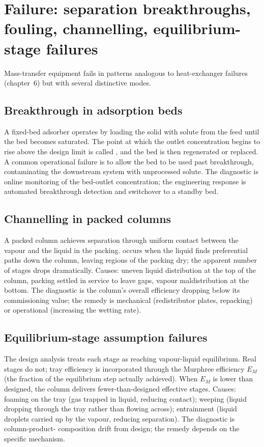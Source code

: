 \section{Failure: separation breakthroughs, fouling, channelling, equilibrium-stage failures}

Mass-transfer equipment fails in patterns analogous to heat-exchanger
failures (chapter~6) but with several distinctive modes.

\subsection{Breakthrough in adsorption beds}

A fixed-bed adsorber operates by loading the solid with solute from
the feed until the bed becomes saturated. The point at which the
outlet concentration begins to rise above the design limit is called
, and the bed is then regenerated or replaced.
A common operational failure is to allow the bed to be used past
breakthrough, contaminating the downstream system with unprocessed
solute. The diagnostic is online monitoring of the bed-outlet
concentration; the engineering response is automated breakthrough
detection and switchover to a standby bed.

\subsection{Channelling in packed columns}

A packed column achieves separation through uniform contact between
the vapour and the liquid in the packing. 
occurs when the liquid finds preferential paths down the column,
leaving regions of the packing dry; the apparent number of stages
drops dramatically. Causes: uneven liquid distribution at the top of
the column, packing settled in service to leave gaps, vapour
maldistribution at the bottom. The diagnostic is the column's
overall efficiency dropping below its commissioning value; the
remedy is mechanical (redistributor plates, repacking) or
operational (increasing the wetting rate).

\subsection{Equilibrium-stage assumption failures}

The design analysis treats each stage as reaching vapour-liquid
equilibrium. Real stages do not; tray efficiency is incorporated
through the Murphree efficiency $E_M$ (the fraction of the
equilibrium step actually achieved). When $E_M$ is lower than
designed, the column delivers fewer-than-designed effective stages.
Causes: foaming on the tray (gas trapped in liquid, reducing
contact); weeping (liquid dropping through the tray rather than
flowing across); entrainment (liquid droplets carried up by the
vapour, reducing separation). The diagnostic is column-product-
composition drift from design; the remedy depends on the specific
mechanism.

